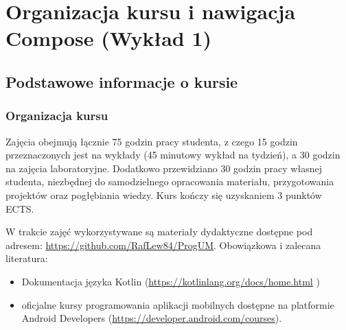 \chapter{Organizacja kursu i nawigacja Compose (Wykład 1)}

\section{Podstawowe informacje o kursie}
\subsection{Organizacja kursu}
Zajęcia obejmują łącznie 75 godzin pracy studenta, z czego 15 godzin przeznaczonych jest na wykłady (45 minutowy wykład na tydzień), a 30 godzin na zajęcia laboratoryjne. Dodatkowo przewidziano 30 godzin pracy własnej studenta, niezbędnej do samodzielnego opracowania materiału, przygotowania projektów oraz pogłębiania wiedzy. Kurs kończy się uzyskaniem 3 punktów ECTS. 

W trakcie zajęć wykorzystywane są materiały dydaktyczne dostępne pod adresem: \url{https://github.com/RafLew84/ProgUM}.  Obowiązkowa i zalecana literatura:
\begin{itemize}
\item Dokumentacja języka Kotlin (\url{https://kotlinlang.org/docs/home.html}
) 
\item oficjalne kursy programowania aplikacji mobilnych dostępne na platformie Android Developers (\url{https://developer.android.com/courses}).
\end{itemize}

